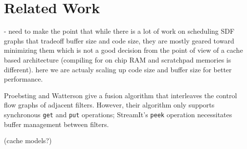 \section{Related Work}
\label{sec:related-work}


- need to make the point that while there is a lot of work on
  scheduling SDF graphs that tradeoff buffer size and code size, they
  are mostly geared toward minimizing them which is not a good
  decision from the point of view of a cache based architecture
  (compiling for on chip RAM and scratchpad memories is different).
  here we are actualy scaling up code size and buffer size for better
  performance. 

Proebsting and Watterson \cite{pro96} give a fusion algorithm that
interleaves the control flow graphs of adjacent filters.  However,
their algorithm only supports synchronous {\tt get} and {\tt put}
operations; StreamIt's {\tt peek} operation necessitates buffer
management between filters.

(cache models?)